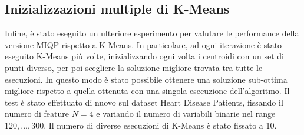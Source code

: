 \documentclass{article}
\begin{document}
    \subsection{Inizializzazioni multiple di K-Means}
    Infine, è stato eseguito un ulteriore esperimento per valutare le performance della versione MIQP rispetto a K-Means. In particolare, ad ogni iterazione è stato eseguito K-Means più volte, inizializzando ogni volta i centroidi con un set di punti diverso, per poi scegliere la soluzione migliore trovata tra tutte le esecuzioni. In questo modo è stato possibile ottenere una soluzione sub-ottima migliore rispetto a quella ottenuta con una singola esecuzione dell'algoritmo.
    Il test è stato effettuato di nuovo sul dataset Heart Disease Patients, fissando il numero di feature $N=4$ e variando il numero di variabili binarie nel range $120,...,300$. Il numero di diverse esecuzioni di K-Means è stato fissato a 10.\\
\end{document}
